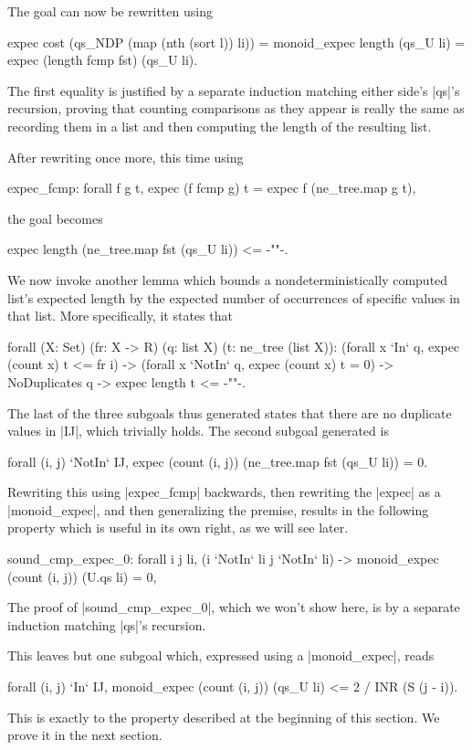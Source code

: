 \documentclass[runningheads]{llncs}
\begin{document}
The goal can now be rewritten using
\begin{code}expec cost (qs_NDP (map (nth (sort l)) li))
  = monoid_expec length (qs_U li) = expec (length fcmp fst) (qs_U li).
\end{code}
The first equality is justified by a separate induction matching either side's |qs|'s recursion, proving that counting comparisons as they appear is really the same as recording them in a list and then computing the length of the resulting list.

After rewriting once more, this time using\begin{code}expec_fcmp: forall f g t, expec (f fcmp g) t = expec f (ne_tree.map g t),\end{code}the goal becomes
\begin{code}
  expec length (ne_tree.map fst (qs_U li)) <= {-""-}.
\end{code}
We now invoke another lemma which bounds a nondeterministically computed list's expected length by the expected number of occurrences of specific values in that list. More specifically, it states that

\parbox{\textwidth}{\begin{code}
  forall (X: Set) (fr: X -> R) (q: list X) (t: ne_tree (list X)):
    (forall x `In` q, expec (count x) t <= fr i) ->
    (forall x `NotIn` q, expec (count x) t = 0) ->
    NoDuplicates q -> expec length t <= {-""-}.
\end{code}}
The last of the three subgoals thus generated states that there are no duplicate values in |IJ|, which trivially holds. The second subgoal generated is\begin{code}forall (i, j) `NotIn` IJ, expec (count (i, j)) (ne_tree.map fst (qs_U li)) = 0.\end{code} Rewriting this using |expec_fcmp| backwards, then rewriting the |expec| as a |monoid_expec|, and then generalizing the premise, results in the following property which is useful in its own right, as we will see later.
\begin{code}sound_cmp_expec_0: forall i j li, (i `NotIn` li \/ j `NotIn` li) ->
  monoid_expec (count (i, j)) (U.qs li) = 0,\end{code}
The proof of |sound_cmp_expec_0|, which we won't show here, is by a separate induction matching |qs|'s recursion.

This leaves but one subgoal which, expressed using a |monoid_expec|, reads
\begin{code}
  forall (i, j) `In` IJ, monoid_expec (count (i, j)) (qs_U li) <= 2 / INR (S (j - i)).
\end{code}
This is exactly  to the property described at the beginning of this section. We prove it in the next section.
\end{document}
